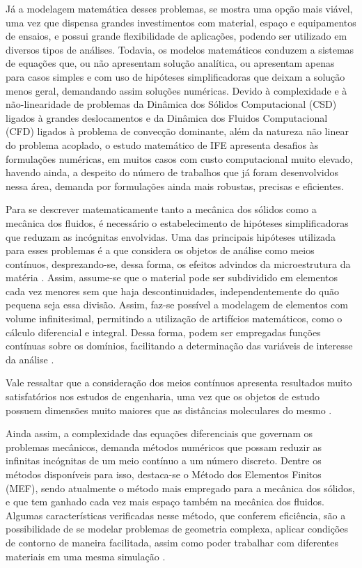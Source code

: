 Já a modelagem matemática desses problemas, se mostra uma opção mais viável, uma vez que dispensa grandes investimentos com material, espaço e equipamentos de ensaios, e possui grande flexibilidade de aplicações, podendo ser utilizado em diversos tipos de análises. Todavia, os modelos matemáticos conduzem a sistemas de equações que, ou não apresentam solução analítica, ou apresentam apenas para casos simples e com uso de hipóteses simplificadoras que deixam a solução menos geral, demandando assim soluções numéricas. Devido à complexidade e à não-linearidade de problemas da Dinâmica dos Sólidos Computacional (CSD) ligados à grandes deslocamentos e da Dinâmica dos Fluidos Computacional (CFD) ligados à problema de convecção dominante, além da natureza não linear do problema acoplado, o estudo matemático de IFE apresenta desafios às formulações numéricas, em muitos casos com custo computacional muito elevado, havendo ainda, a despeito do número de trabalhos que já foram desenvolvidos nessa área, demanda por formulações ainda mais robustas, precisas e eficientes.

Para se descrever matematicamente tanto a mecânica dos sólidos como a mecânica dos fluidos, é necessário o estabelecimento de hipóteses simplificadoras que reduzam as incógnitas envolvidas. Uma das principais hipóteses utilizada para esses problemas é a que considera os objetos de análise como meios contínuos, desprezando-se, dessa forma, os efeitos advindos da microestrutura da matéria \cite{lai2009introduction, mase2009continuum}. Assim, assume-se que o material pode ser subdividido em elementos cada vez menores sem que haja descontinuidades, independentemente do quão pequena seja essa divisão. Assim, faz-se possível a modelagem de elementos com volume infinitesimal, permitindo a utilização de artifícios matemáticos, como o cálculo diferencial e integral. Dessa forma, podem ser empregadas funções contínuas sobre os domínios, facilitando a determinação das variáveis de interesse da análise \cite{irgens2008continuum, lai2009introduction, malvern1969introduction}.

Vale ressaltar que a consideração dos meios contínuos apresenta resultados muito satisfatórios nos estudos de engenharia, uma vez que os objetos de estudo possuem dimensões muito maiores que as distâncias moleculares do mesmo \cite{malvern1969introduction, mase2009continuum}.

Ainda assim, a complexidade das equações diferenciais que governam os problemas mecânicos, demanda métodos numéricos que possam reduzir as infinitas incógnitas de um meio contínuo a um número discreto. Dentre os métodos disponíveis para isso, destaca-se o Método dos Elementos Finitos (MEF), sendo atualmente o método mais empregado para a mecânica dos sólidos, e que tem ganhado cada vez mais espaço também na mecânica dos fluidos. Algumas características verificadas nesse método, que conferem eficiência, são a possibilidade de se modelar problemas de geometria complexa, aplicar condições de contorno de maneira facilitada, assim como poder trabalhar com diferentes materiais em uma mesma simulação \cite{anderson1995computational}.

